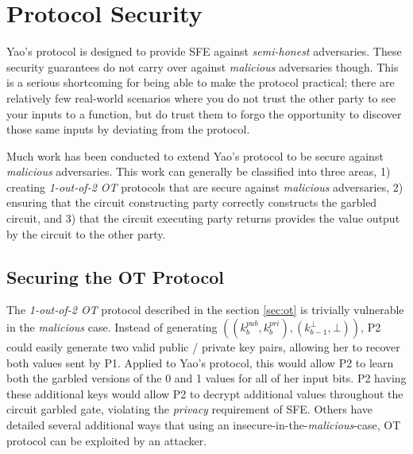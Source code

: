 \section{Protocol Security}
\label{sec:security}

Yao's protocol is designed to provide \ac{SFE} against \emph{semi-honest} adversaries. These security guarantees do not carry over against \emph{malicious} adversaries though.  This is a serious shortcoming for being able to make the protocol practical; there are relatively few real-world scenarios where you do not trust the other party to see your inputs to a function, but do trust them to forgo the opportunity to discover those same inputs by deviating from the protocol.

Much work has been conducted to extend Yao's protocol to be secure against \emph{malicious} adversaries.  This work can generally be classified into three areas, 1) creating \emph{1-out-of-2 \ac{OT}} protocols that are secure against \emph{malicious} adversaries, 2) ensuring that the circuit constructing party correctly constructs the garbled circuit, and 3) that the circuit executing party returns provides the value output by the circuit to the other party.

\subsection{Securing the \ac{OT} Protocol}

The \emph{1-out-of-2 \ac{OT}} protocol described in the section \ref{sec:ot} is trivially vulnerable in the \emph{malicious} case.  Instead of generating $((k^{pub}_b, k^{pri}_b), (k^\bot_{b-1}, \bot))$, \ac{P2} could easily generate two valid public / private key pairs, allowing her to recover both values sent by \ac{P1}. Applied to Yao's protocol, this would allow \ac{P2} to learn both the garbled versions of the 0 and 1 values for all of her input bits. \ac{P2} having these additional keys would allow \ac{P2} to decrypt additional values throughout the circuit garbled gate, violating the \emph{privacy} requirement of \ac{SFE}.  Others have detailed several additional ways that using an insecure-in-the-\emph{malicious}-case, \ac{OT} protocol can be exploited by an attacker\cite{kiraz2006protocol}.

